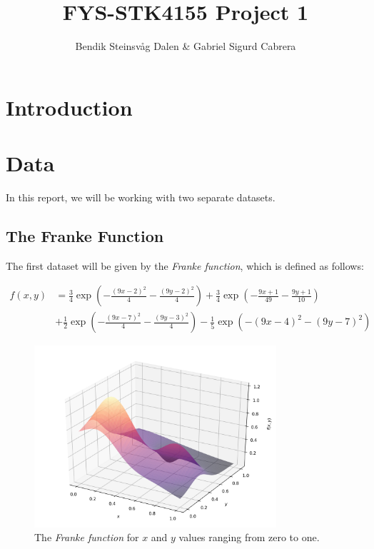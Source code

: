 \documentclass[a4paper,10pt,english]{article}
\begin{document}
\title{FYS-STK4155 Project 1}
\author{Bendik Steinsvåg Dalen \& Gabriel Sigurd Cabrera}
\maketitle

\begin{abstract}

\end{abstract}

\section*{Introduction}
\label{sec:introduction}

\section*{Data}
\label{sec:method}

	In this report, we will be working with two separate datasets.
	
	\subsection*{The Franke Function}
	
	The first dataset will be given by the \textit{Franke function}, which is defined as follows:
	
	\begin{align*}
	f(x,y) &= \frac{3}{4} \exp \left( -\frac{(9x-2)^2}{4} -\frac{(9y-2)^2}{4} \right) + \frac{3}{4} \exp \left( -\frac{9x+1}{49} -\frac{9y+1}{10} \right) \\ &+ \frac{1}{2} \exp \left( -\frac{(9x-7)^2}{4} -\frac{(9y-3)^2}{4} \right) - \frac{1}{5} \exp \left( -(9x-4)^2 - (9y-7)^2 \right)
	\end{align*}

	\begin{figure}[H]
		\centering
		\includegraphics[width = 0.8\textwidth, center]{Franke.png}
		\caption{The \textit{Franke function} for $x$ and $y$ values ranging from zero to one. \label{fig_Franke}}
	\end{figure}
\end{document}
